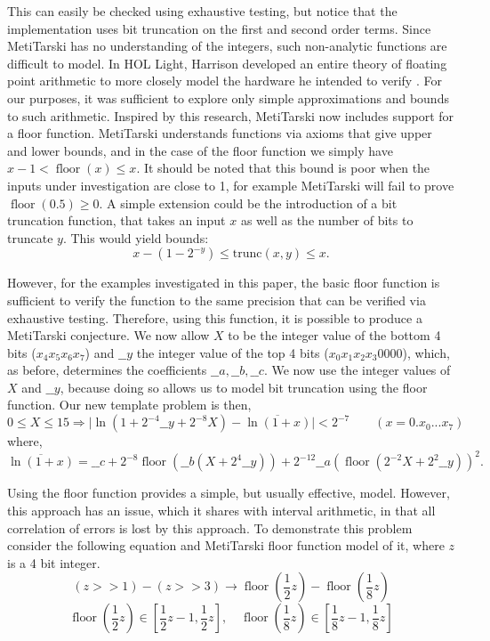 \documentclass{fac}
\newcommand{\abs}[1]{\lvert#1\rvert}
\newcommand{\floor}{\mathop{\textrm{floor}}\nolimits}
\begin{document}
This can easily be checked using exhaustive testing, but notice that the implementation uses bit truncation on the first and second order terms. Since MetiTarski has no understanding of the integers, such non-analytic functions are difficult to model. In HOL Light, Harrison developed an entire theory of floating point arithmetic to more closely model the hardware he intended to verify \cite{harrison1999machine}. For our purposes, it was sufficient to explore only simple approximations and bounds to such arithmetic. Inspired by this research, MetiTarski now includes support for a floor function. MetiTarski understands functions via axioms that give upper and lower bounds, and in the case of the floor function we simply have $x-1< \floor(x)\le x$. It should be noted that this bound is poor when the inputs under investigation are close to 1, for example MetiTarski will fail to prove $\floor(0.5)\geq 0$. A simple extension could be the introduction of a bit truncation function, that takes an input $x$ as well as the number of bits to truncate $y$. This would yield bounds:
\begin{equation}
    x - (1-2^{-y}) \leq \textrm{trunc}(x,y)\leq x.
\label{trunc_bound}
\end{equation}

However, for the examples investigated in this paper, the basic floor function is sufficient to verify the function to the same precision that can be verified via exhaustive testing. Therefore, using this function, it is possible to produce a MetiTarski conjecture. We now allow $X$ to be the integer value of the bottom 4 bits ($x_4x_5x_6x_7$) and $\_\_y$ the integer value of the top 4 bits ($x_0x_1x_2x_3 0000$), which, as before, determines the coefficients $\_\_a, \_\_b, \_\_c$. We now use the integer values of $X$ and $\_\_y$, because doing so allows us to model bit truncation using the floor function. Our new template problem is then, 
\[
0\le X \le 15 \Rightarrow \abs{\ln(1+2^{-4}\_\_y+2^{-8}X) - \overline{\ln(1+x)}} <2^{-7} \qquad (x= 0.x_0...x_7)
\]
where,
\[
\overline{\ln(1+x)}=\_\_c+2^{-8}\floor(\_\_b(X+2^{4}\_\_y))+2^{-12}\_\_a(\floor(2^{-2}X+2^{2}\_\_y))^2.
\]

Using the floor function provides a simple, but usually effective, model. However, this approach has an issue, which it shares with interval arithmetic, in that all correlation of errors is lost by this approach. To demonstrate this problem consider the following equation and MetiTarski floor function model of it, where $z$ is a 4 bit integer.
\[
(z>>1) - (z>>3) \rightarrow  \floor(\frac{1}{2}z) - \floor(\frac{1}{8}z)
\]
\[
\floor(\frac{1}{2}z) \in [\frac{1}{2}z-1, \frac{1}{2}z], \quad \floor(\frac{1}{8}z) \in [\frac{1}{8}z-1,\frac{1}{8}z]
\]
\end{document}
